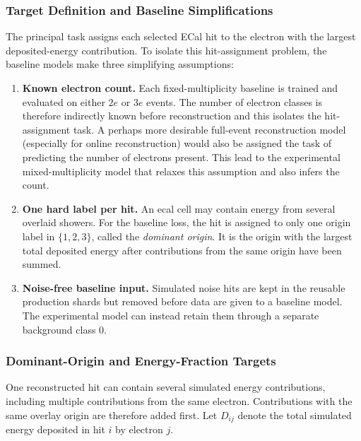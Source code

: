 \subsubsection{Target Definition and Baseline Simplifications}
\label{sec:method_targets}

The principal task assigns each selected ECal hit to the electron with the
largest deposited-energy contribution. To isolate this hit-assignment problem,
the baseline models make three simplifying assumptions:

\begin{enumerate}
    \item \textbf{Known electron count.} Each fixed-multiplicity baseline is
    trained and evaluated on either \(2e\) or \(3e\) events. The number of
    electron classes is therefore indirectly known before reconstruction and this isolates the hit-assignment task. A perhaps more desirable full-event reconstruction model (especially for online reconstruction) would also be assigned the task of predicting the number of electrons present. This lead to the experimental mixed-multiplicity model that relaxes this assumption and also infers the count.

    \item \textbf{One hard label per hit.} An \gls{ecal} cell may contain
    energy from several overlaid showers. For the baseline loss, the hit is
    assigned to only one origin label in \(\{1,2,3\}\), called the
    \textit{dominant origin}. It is the origin with the largest total
    deposited energy after contributions from the same origin have been summed.

    \item \textbf{Noise-free baseline input.} Simulated noise hits are kept in
    the reusable production shards but removed before data are given to a
    baseline model. The experimental model can instead retain them through a
    separate background class \(0\).
\end{enumerate}


\subsubsection{Dominant-Origin and Energy-Fraction Targets}

One reconstructed hit can contain several simulated energy contributions,
including multiple contributions from the same electron. Contributions with
the same overlay origin are therefore added first. Let \(D_{ij}\) denote the
total simulated energy deposited in hit \(i\) by electron \(j\).

